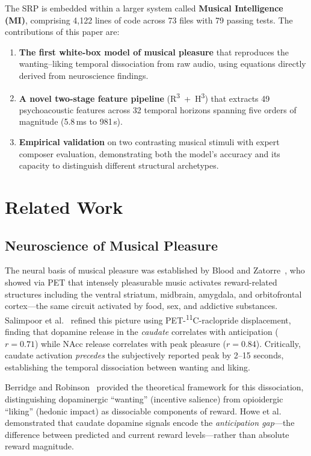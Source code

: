 \documentclass[10pt,twocolumn]{article}
\newcommand{\Rtri}{R\textsuperscript{3}}
\newcommand{\Htri}{H\textsuperscript{3}}
\begin{document}
The SRP is embedded within a larger system called \textbf{Musical Intelligence (MI)}, comprising 4,122 lines of code across 73 files with 79 passing tests. The contributions of this paper are:

\begin{enumerate}
\item \textbf{The first white-box model of musical pleasure} that reproduces the wanting--liking temporal dissociation from raw audio, using equations directly derived from neuroscience findings.
\item \textbf{A novel two-stage feature pipeline} (\Rtri{}~+~\Htri{}) that extracts 49 psychoacoustic features across 32 temporal horizons spanning five orders of magnitude (5.8\,ms to 981\,s).
\item \textbf{Empirical validation} on two contrasting musical stimuli with expert composer evaluation, demonstrating both the model's accuracy and its capacity to distinguish different structural archetypes.
\end{enumerate}


\section{Related Work}
\label{sec:related}

\subsection{Neuroscience of Musical Pleasure}

The neural basis of musical pleasure was established by Blood and Zatorre~\cite{Blood2001}, who showed via PET that intensely pleasurable music activates reward-related structures including the ventral striatum, midbrain, amygdala, and orbitofrontal cortex---the same circuit activated by food, sex, and addictive substances. Salimpoor et al.~\cite{Salimpoor2011} refined this picture using PET-\textsuperscript{11}C-raclopride displacement, finding that dopamine release in the \textit{caudate} correlates with anticipation ($r=0.71$) while NAcc release correlates with peak pleasure ($r=0.84$). Critically, caudate activation \textit{precedes} the subjectively reported peak by 2--15 seconds, establishing the temporal dissociation between wanting and liking.

Berridge and Robinson~\cite{Berridge2003} provided the theoretical framework for this dissociation, distinguishing dopaminergic ``wanting'' (incentive salience) from opioidergic ``liking'' (hedonic impact) as dissociable components of reward. Howe et al.~\cite{Howe2013} demonstrated that caudate dopamine signals encode the \textit{anticipation gap}---the difference between predicted and current reward levels---rather than absolute reward magnitude.
\end{document}
